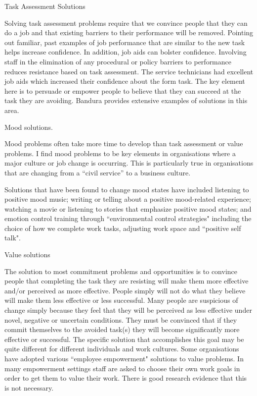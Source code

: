 
Task Assessment Solutions

Solving task assessment problems require that we convince people that they can do a job and that existing barriers to their performance will be removed. Pointing out familiar, past examples of job performance that are similar to the new task helps increase confidence. In addition, job aids can bolster confidence. Involving staff in the elimination of any procedural or policy barriers to performance reduces resistance based on task assessment. The service technicians had excellent job aids which increased their confidence about the form task. The key element here is to persuade or empower people to believe that they can succeed at the task they are avoiding. Bandura provides extensive examples of solutions in this area.

Mood solutions.

Mood problems often take more time to develop than task assessment or value problems. I find mood problems to be key elements in organisations where a major culture or job change is occurring. This is particularly true in organisations that are changing from a “civil service” to a business culture.

Solutions that have been found to change mood states have included listening to positive mood music; writing or telling about a positive mood-related experience; watching a movie or listening to stories that emphasize positive mood states; and emotion control training through ``environmental control strategies" including the choice of how we complete work tasks, adjusting work space and ``positive self talk".

Value solutions

The solution to most commitment problems and opportunities is to convince people that completing the task they are resisting will make them more effective and/or perceived as more effective. People simply will not do what they believe will make them less effective or less successful. Many people are suspicious of change simply because they feel that they will be perceived as less effective under novel, negative or uncertain conditions. They must be convinced that if they commit themselves to the avoided task(s) they will become significantly more effective or successful. The specific solution that accomplishes this goal may be quite different for different individuals and work cultures. Some organisations have adopted various ``employee empowerment" solutions to value problems. In many empowerment settings staff are asked to choose their own work goals in order to get them to value their work. There is good research evidence that this is not necessary.

